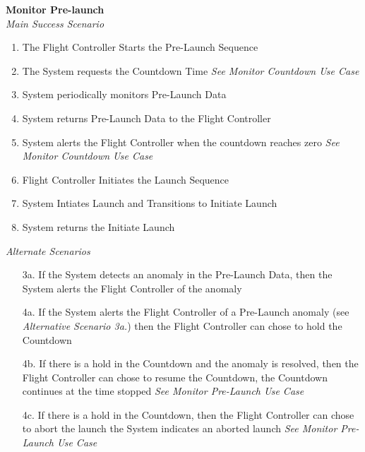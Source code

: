 \documentclass[letterpaper]{article}
\begin{document}
\noindent
\textbf{Monitor Pre-launch}\\
\textit{Main Success Scenario}
\begin{enumerate}
\item The Flight Controller Starts the Pre-Launch Sequence
\item The System requests the Countdown Time \textit{See Monitor
Countdown Use Case}
\item System periodically monitors Pre-Launch Data
\item System returns Pre-Launch Data to the Flight Controller
\item System alerts the Flight Controller when the countdown reaches
   zero \textit{See Monitor Countdown Use Case}
\item Flight Controller Initiates the Launch Sequence
\item System Intiates Launch and Transitions to Initiate Launch
\item System returns the Initiate Launch
\end{enumerate}
\textit{Alternate Scenarios}
\begin{itemize}
\item[3a.]  If the System detects an anomaly in the Pre-Launch
Data, then the System alerts the Flight Controller of the anomaly
\item[4a.]  If the System alerts the Flight Controller of a Pre-Launch
anomaly (see \textit{Alternative Scenario 3a.}) then the Flight
Controller can chose to hold the Countdown
\item[4b.]  If there is a hold in the Countdown and the anomaly is
resolved, then the Flight Controller can chose to resume the
Countdown, the Countdown continues at the time stopped \textit{See
Monitor Pre-Launch Use Case}
\item[4c.]  If there is a hold in the Countdown, then the Flight
Controller can chose to abort the launch the System indicates an
aborted launch \textit{See Monitor Pre-Launch Use Case}
\end{itemize}
\end{document}
